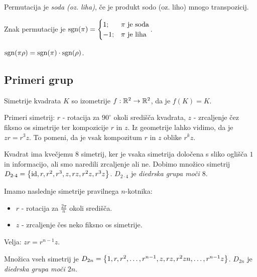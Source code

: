 \begin{definicija}
    Permutacija je \emph{soda (oz. liha)}, če je produkt sodo (oz. liho) mnogo transpozicij.
\end{definicija}

\begin{definicija}
    Znak permutacije je $\operatorname{sgn}(\pi) = \begin{cases}
        1; &\pi \text{ je soda} \\
        -1; &\pi \text{ je liha}
    \end{cases}$.
\end{definicija}

\begin{trditev}
    $\operatorname{sgn}(\pi \rho) = \operatorname{sgn}(\pi) \cdot \operatorname{sgn}(\rho)$.
\end{trditev}

\subsection{Primeri grup}
\begin{zgled}
    Simetrije kvadrata $K$ so izometrije $f: \mathbb{R}^2 \to \mathbb{R}^2$, da je $f(K) = K$. 
    
    Primeri simetrij: $r$ - rotacija za $90^{\circ}$ okoli središča kvadrata, $z$ - zrcaljenje čez fiksno os simetrije ter kompozicije $r$ in $z$. Iz geometrije lahko vidimo, da je $zr = r^3z$. To pomeni, da je vsak kompozitum $r$ in $z$ oblike $r^kz$.
    
    Kvadrat ima kvečjemu $8$ simetrij, ker je vsaka simetrija določena s sliko oglišča $1$ in informacijo, ali smo naredili zrcaljenje ali ne. Dobimo množico simetrij $D_{2 \cdot 4} = \left\{\operatorname{id}, r, r^2, r^3, z, rz, r^2z, r^3z\right\}$. $D_{2\cdot 4}$ je \emph{diedrska grupa moči $8$}.
\end{zgled}

\begin{zgled}
    Imamo naslednje simetrije pravilnega $n$-kotnika:
    \begin{itemize}
        \item $r$ - rotacija za $\frac{2 \pi}{n}$ okoli središča.
        \item $z$ - zrcaljenje čes neko fiksno os simetrije.
    \end{itemize}
    Velja: $zr = r^{n-1}z$. 
    
    Množica vseh simetrij je $D_{2n} = \left\{1, r, r^2, \ldots, r^{n-1}, z, rz, r^2zn, \ldots, r^{n-1}z\right\}$. $D_{2n}$ je \emph{diedrska grupa moči $2n$}.
\end{zgled}

